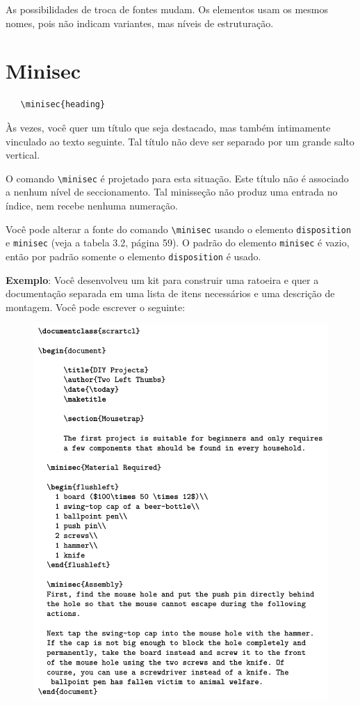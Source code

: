 As possibilidades de troca de fontes mudam. Os elementos usam os mesmos nomes, pois não indicam variantes, mas níveis de estruturação.

\section{Minisec}
\begin{verbatim}
   \minisec{heading} 
\end{verbatim}

Às vezes, você quer um título que seja destacado, mas também intimamente vinculado ao texto seguinte. Tal título não deve ser separado por um grande salto vertical.

O comando \verb|\minisec| é projetado para esta situação. Este título não é associado a nenhum nível de seccionamento. Tal minisseção não produz uma entrada no índice, nem recebe nenhuma numeração.

Você pode alterar a fonte do comando \verb|\minisec| usando o elemento \texttt{disposition} e \texttt{minisec} (veja a tabela 3.2, página 59). O padrão do elemento \texttt{minisec} é vazio, então por padrão somente o elemento \texttt{disposition} é usado.

\textbf{Exemplo}: Você desenvolveu um kit para construir uma ratoeira e quer a documentação separada em uma lista de itens necessários e uma descrição de montagem. Você pode escrever o seguinte:

\begin{figure}
    \centering
    \includegraphics[width=0.8\linewidth]{imagens/imagem21.png}
    \label{fig:img21}
\end{figure}

